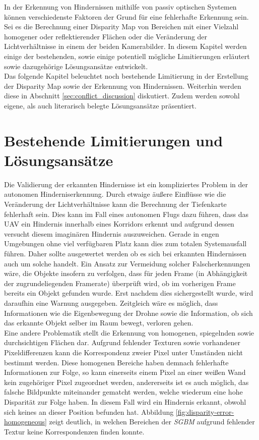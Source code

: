 In der Erkennung von Hindernissen mithilfe von passiv optischen Systemen können verschiedenste Faktoren der Grund für eine fehlerhafte Erkennung sein. Sei es die Berechnung einer Disparity Map von Bereichen mit einer Vielzahl homogener oder reflektierender Flächen oder die Veränderung der Lichtverhältnisse in einem der beiden Kamerabilder. In diesem Kapitel werden einige der bestehenden, sowie einige potentiell mögliche Limitierungen erläutert sowie dazugehörige Lösungsansätze entwickelt.\\

\noindent
Das folgende Kapitel beleuchtet noch bestehende Limitierung in der Erstellung der Disparity Map sowie der Erkennung von Hindernissen. Weiterhin werden diese in Abschnitt \ref{sec:conflict_discussion} diskutiert. Zudem werden sowohl eigene, als auch literarisch belegte Lösungsansätze präsentiert.

\section{Bestehende Limitierungen und Lösungsansätze}
\label{sec:existing_conflicts}

Die Validierung der erkannten Hindernisse ist ein kompliziertes Problem in der autonomen Hinderniserkennung. Durch etwaige äußere Einflüsse wie die Veränderung der Lichtverhältnisse kann die Berechnung der Tiefenkarte fehlerhaft sein. Dies kann im Fall eines autonomen Flugs dazu führen, dass das UAV ein Hindernis innerhalb eines Korridors erkennt und aufgrund dessen versucht diesem imaginären Hindernis auszuweichen. Gerade in engen Umgebungen ohne viel verfügbaren Platz kann dies zum totalen Systemausfall führen. Daher sollte ausgewertet werden ob es sich bei erkannten Hindernissen auch um solche handelt. Ein Ansatz zur Vermeidung solcher Falscherkennungen wäre, die Objekte insofern zu verfolgen, dass für jeden Frame (in Abhängigkeit der zugrundeliegenden Framerate) überprüft wird, ob im vorherigen Frame bereits ein Objekt gefunden wurde. Erst nachdem dies sichergestellt wurde, wird daraufhin eine Warnung ausgegeben. Zeitgleich wäre es möglich, dass Informationen wie die Eigenbewegung der Drohne sowie die Information, ob sich das erkannte Objekt selber im Raum bewegt, verloren gehen.\\

\noindent
Eine andere Problematik stellt die Erkennung von homogenen, spiegelnden sowie durchsichtigen Flächen dar. Aufgrund fehlender Texturen sowie vorhandener Pixeldifferenzen kann die Korrespondenz zweier Pixel unter Umständen nicht bestimmt werden. Diese homogenen Bereiche haben demnach fehlerhafte Informationen zur Folge, so kann  einerseits einem Pixel an einer weißen Wand kein zugehöriger Pixel zugeordnet werden, andererseits ist es auch möglich, das falsche Bildpunkte miteinander gematcht werden, welche wiederum eine hohe Disparität zur Folge haben. In diesem Fall wird ein Hindernis erkannt, obwohl sich keines an dieser Position befunden hat. Abbildung \ref{fig:disparity-error-homogeneous} zeigt deutlich, in welchen Bereichen der \emph{SGBM} aufgrund fehlender Textur keine Korrespondenzen finden konnte.\\

